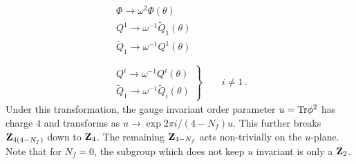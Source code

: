 \begin{equation}
\begin{array}{l}
\left.\begin{array}{l}
\Phi \rightarrow \omega^2 \Phi(\theta) \\
Q^1 \rightarrow \omega^{-1} \widetilde{Q}_1(\theta) \\
\widetilde{Q}_1 \rightarrow \omega^{-1} Q^1(\theta) \\
\end{array} \right.\\
\left.\begin{array}{l}
Q^i \rightarrow \omega^{-1} Q^i(\theta) \\
\widetilde{Q}_1 \rightarrow \omega^{-1} \widetilde{Q}_i(\theta) 
\end{array} \right\}
\qquad i \not= 1\,.
\end{array}
\label{symm-A}
\end{equation}
Under this transformation, the gauge invariant order parameter $u={\rm
Tr}\phi^2$ has charge $4$ and transforms as $u \rightarrow \exp 2 \pi
i /(4-N_f) u$. This further breaks ${\bf Z}_{4(4-N_f)}$ down to ${\bf
Z}_4$. The remaining ${\bf Z}_{4-N_f}$ acts non-trivially on the
$u$-plane. Note that for $N_f=0$, the subgroup which does not keep $u$
invariant is only a ${\bf Z}_2$.


